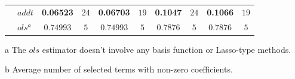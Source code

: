 \begin{table}[!htbp]
{\begin{threeparttable}
\begin{tabular}{llcccccccc}
            & $addt$ & \textbf{0.06523} & $24$ & \textbf{0.06703} & $19$ & \textbf{0.1047} & $24$ & \textbf{0.1066} & $19$ \\
            & $ols^a$  & $0.74993$ & $5$ & $0.74993$ & $5$ & $0.7876$ & $5$ & $0.7876$ & $5$ \\
            \hline 
            \hline
        \end{tabular}
        \begin{tablenotes}
            \item [a] The $ols$ estimator doesn't involve any basis function or Lasso-type methods.
            \item [b] Average number of selected terms with non-zero coefficients.
        \end{tablenotes}
        \end{threeparttable}
        }
    \end{table} 

